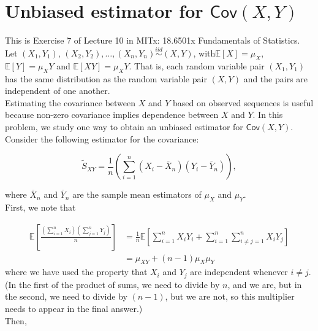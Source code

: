 \documentclass[10pt,landscape]{article}
\begin{document}
\section*{Unbiased estimator for $\textsf{Cov}(X,Y)$}

This is Exercise 7 of Lecture 10 in MITx: 18.6501x Fundamentals of Statistics.\\

Let $(X_1,Y_1),\, (X_2,Y_2),\ldots ,(X_ n,Y_ n) \stackrel{iid}{\sim } (X,Y)$, with$\mathbb E[X]=\mu _ X$, $\mathbb E[Y]=\mu _ XY$ and $\mathbb E[XY]=\mu _ XY$. That is, each random variable pair $(X_1,Y_1)$ has the same distribution as the random variable pair $(X,Y)$ and the pairs are independent of one another.\\

Estimating the covariance between $X$  and $Y$ based on observed sequences is useful because non-zero covariance implies dependence between $X$ and $Y$. In this problem, we study one way to obtain an unbiased estimator for $\textsf{Cov}(X,Y)$. \\

Consider the following estimator for the covariance:

$$\widetilde{S}_{XY} = \frac{1}{n}\left(\sum _{i=1}^ n \left(X_ i - \overline{X}_ n\right)\left(Y_ i - \overline{Y}_ n \right)\right),$$

where $\overline X_n$ and $\overline Y_n$ are the sample mean estimators of $\mu_X$ and $\mu_Y$.\\

First, we note that

\begin{align*}
\mathbb{E} \left[\frac{\left(\sum_{i=1}^nX_i\right)\left(\sum_{j=1}^nY_j\right)}{n}\right]&=\frac{1}{n}\mathbb{E} \left[\sum_{i=1}^nX_iY_i + \sum_{i=1}^n \sum_{i\neq j=1}^n X_i Y_j\right]\\
&=\mu_{XY}+(n-1)\mu_X\mu_Y
\end{align*}
where we have used the property that $X_i$ and $Y_j$ are independent whenever $i\neq j.$
(In the first of the product of sums, we need to divide by $n$, and we are, but in the second, we need to divide by $(n-1)$, but we are not, so this multiplier needs to appear in the final answer.)\\

Then,
\end{document}
